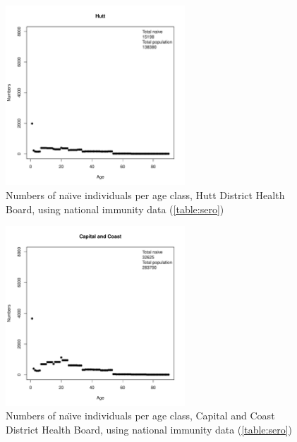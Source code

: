 \documentclass{article}
\begin{document}
\begin{figure}[H]
     \begin{center}
     \includegraphics[width=0.6\textwidth]{dhb13.pdf}
     \end{center}
     \caption{Numbers of na\"{\i}ve individuals per age class, Hutt District Health Board, using national immunity data (\autoref{table:sero})}
     \label{fig:Hutt}
\end{figure}

\begin{figure}[H]
     \begin{center}
     \includegraphics[width=0.6\textwidth]{dhb14.pdf}
     \end{center}
     \caption{Numbers of na\"{\i}ve individuals per age class, Capital and Coast District Health Board, using national immunity data (\autoref{table:sero})}
     \label{fig:CapitalandCoast}
\end{figure}
\end{document}
